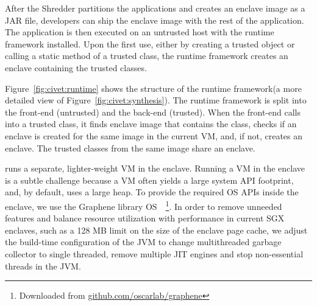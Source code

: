 After the Shredder partitions the applications
and creates an enclave image as a JAR file,
developers can ship the enclave image with the rest of the application.
The application is then executed on an untrusted host with the 
\sysname{} runtime framework installed.
Upon the first use, either by creating a trusted object or calling a static method of a trusted class,
the \sysname{} runtime framework creates an enclave containing the trusted classes.


Figure~\ref{fig:civet:runtime} shows the structure of the \sysname{} runtime framework(a more detailed view of Figure~\ref{fig:civet:synthesis}).
The \sysname{} runtime framework is split into the front-end (untrusted) and the back-end (trusted).
When the front-end calls into a trusted class,
it finds enclave image that contains the class,
checks if an enclave is created for the same image in the current \java{} VM,
and, if not, creates an enclave.
The trusted classes from the same image share an enclave.

\sysname{} runs a separate, lighter-weight \java{} VM in the enclave.
Running a \java{} VM in the enclave is a subtle challenge because a \java{} VM
often yields a large system API footprint, and, by default, uses a large heap. %
To provide the required OS APIs inside the enclave, we use the Graphene library OS~\citep{tsai14graphene}~\footnote{Downloaded from \url{github.com/oscarlab/graphene}}.
In order to remove unneeded features and balance resource utilization with performance in current SGX enclaves, such as
a 128 MB limit on the size of the enclave page cache,
we adjust the build-time configuration of the JVM to change multithreaded garbage collector to single threaded, remove multiple JIT engines and stop non-essential threads in the JVM. 



